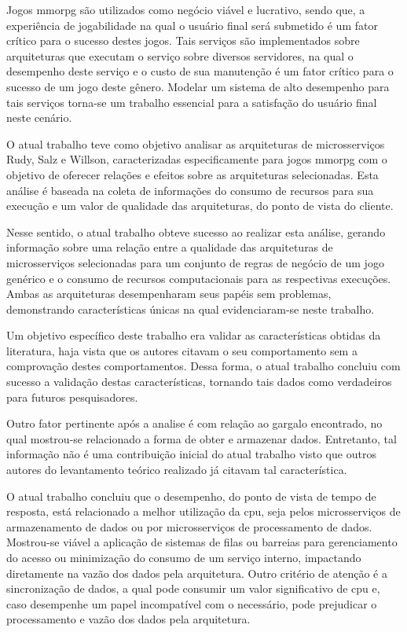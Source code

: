 


Jogos \ac{mmorpg} são utilizados como negócio viável e lucrativo, sendo que, a experiência de jogabilidade na qual o usuário final será submetido é um fator crítico para o sucesso destes jogos.
%
Tais serviços são implementados sobre arquiteturas que executam o serviço sobre diversos servidores, na qual o desempenho deste serviço e o custo de sua manutenção é um fator crítico para o sucesso de um jogo deste gênero.
%
Modelar um sistema de alto desempenho para tais serviços torna-se um trabalho essencial para a satisfação do usuário final neste cenário.


O atual trabalho teve como objetivo analisar as arquiteturas de microsserviços Rudy, Salz e Willson, caracterizadas especificamente para jogos \ac{mmorpg} com o objetivo de oferecer relações e efeitos sobre as arquiteturas selecionadas.
%
Esta análise é baseada na coleta de informações do consumo de recursos para sua execução e um valor de qualidade das arquiteturas, do ponto de vista do cliente.

Nesse sentido, o atual trabalho obteve sucesso ao realizar esta análise, gerando informação sobre uma relação entre a qualidade das arquiteturas de microsserviços selecionadas para um conjunto de regras de negócio de um jogo genérico e o consumo de recursos computacionais para as respectivas execuções.
%
Ambas as arquiteturas desempenharam seus papéis sem problemas, demonstrando características únicas na qual evidenciaram-se neste trabalho.

Um objetivo específico deste trabalho era validar as características obtidas da literatura, haja vista que os autores citavam o seu comportamento sem a comprovação destes comportamentos.
%
Dessa forma, o atual trabalho concluiu com sucesso a validação destas características, tornando tais dados como verdadeiros para futuros pesquisadores.

Outro fator pertinente após a analise é com relação ao gargalo encontrado, no qual mostrou-se relacionado a forma de obter e armazenar dados.
%
Entretanto, tal informação não é uma contribuição inicial do atual trabalho visto que outros autores do levantamento teórico realizado já citavam tal característica.

O atual trabalho concluiu que o desempenho, do ponto de vista de tempo de resposta, está relacionado a melhor utilização da \ac{cpu}, seja pelos microsserviços de armazenamento de dados ou por microsserviços de processamento de dados.
%
Mostrou-se viável a aplicação de sistemas de filas ou barreias para gerenciamento do acesso ou minimização do consumo de um serviço interno, impactando diretamente na vazão dos dados pela arquitetura.
%
Outro critério de atenção é a sincronização de dados, a qual pode consumir um valor significativo de \ac{cpu} e, caso desempenhe um papel incompatível com o necessário, pode prejudicar o processamento e vazão dos dados pela arquitetura.

